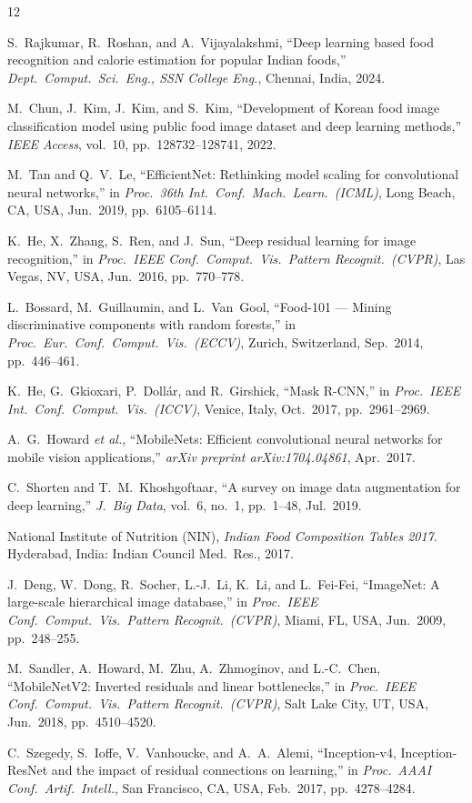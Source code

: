 \documentclass[journal]{IEEEtran}
\begin{document}
\begin{thebibliography}{12}

S.~Rajkumar, R.~Roshan, and A.~Vijayalakshmi, ``Deep learning based food recognition and calorie estimation for popular Indian foods,'' \textit{Dept.\ Comput.\ Sci.\ Eng., SSN College Eng.}, Chennai, India, 2024.

M.~Chun, J.~Kim, J.~Kim, and S.~Kim, ``Development of Korean food image classification model using public food image dataset and deep learning methods,'' \textit{IEEE Access}, vol.~10, pp.~128732--128741, 2022.

M.~Tan and Q.~V.~Le, ``EfficientNet: Rethinking model scaling for convolutional neural networks,'' in \textit{Proc.\ 36th Int.\ Conf.\ Mach.\ Learn.\ (ICML)}, Long Beach, CA, USA, Jun.\ 2019, pp.~6105--6114.

K.~He, X.~Zhang, S.~Ren, and J.~Sun, ``Deep residual learning for image recognition,'' in \textit{Proc.\ IEEE Conf.\ Comput.\ Vis.\ Pattern Recognit.\ (CVPR)}, Las Vegas, NV, USA, Jun.\ 2016, pp.~770--778.

L.~Bossard, M.~Guillaumin, and L.~Van~Gool, ``Food-101 --- Mining discriminative components with random forests,'' in \textit{Proc.\ Eur.\ Conf.\ Comput.\ Vis.\ (ECCV)}, Zurich, Switzerland, Sep.\ 2014, pp.~446--461.

K.~He, G.~Gkioxari, P.~Doll\'{a}r, and R.~Girshick, ``Mask R-CNN,'' in \textit{Proc.\ IEEE Int.\ Conf.\ Comput.\ Vis.\ (ICCV)}, Venice, Italy, Oct.\ 2017, pp.~2961--2969.

A.~G.~Howard \textit{et al.}, ``MobileNets: Efficient convolutional neural networks for mobile vision applications,'' \textit{arXiv preprint arXiv:1704.04861}, Apr.\ 2017.

C.~Shorten and T.~M.~Khoshgoftaar, ``A survey on image data augmentation for deep learning,'' \textit{J.\ Big Data}, vol.~6, no.~1, pp.~1--48, Jul.\ 2019.

National Institute of Nutrition (NIN), \textit{Indian Food Composition Tables 2017}. Hyderabad, India: Indian Council Med.\ Res., 2017.

J.~Deng, W.~Dong, R.~Socher, L.-J.~Li, K.~Li, and L.~Fei-Fei, ``ImageNet: A large-scale hierarchical image database,'' in \textit{Proc.\ IEEE Conf.\ Comput.\ Vis.\ Pattern Recognit.\ (CVPR)}, Miami, FL, USA, Jun.\ 2009, pp.~248--255.

M.~Sandler, A.~Howard, M.~Zhu, A.~Zhmoginov, and L.-C.~Chen, ``MobileNetV2: Inverted residuals and linear bottlenecks,'' in \textit{Proc.\ IEEE Conf.\ Comput.\ Vis.\ Pattern Recognit.\ (CVPR)}, Salt Lake City, UT, USA, Jun.\ 2018, pp.~4510--4520.

C.~Szegedy, S.~Ioffe, V.~Vanhoucke, and A.~A.~Alemi, ``Inception-v4, Inception-ResNet and the impact of residual connections on learning,'' in \textit{Proc.\ AAAI Conf.\ Artif.\ Intell.}, San Francisco, CA, USA, Feb.\ 2017, pp.~4278--4284.

\end{thebibliography}
\end{document}
